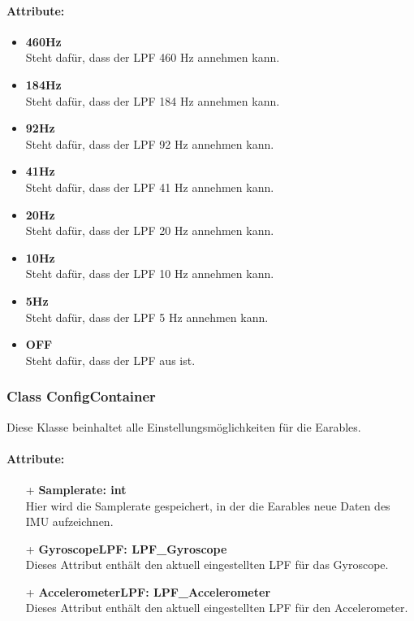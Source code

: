 \documentclass[a4paper,12pt]{article}
\begin{document}
\paragraph{Attribute:}
\begin{itemize}
	\item \textbf{460Hz}\\Steht dafür, dass der LPF 460 Hz annehmen kann.
	\item \textbf{184Hz}\\Steht dafür, dass der LPF 184 Hz annehmen kann.
	\item \textbf{92Hz}\\Steht dafür, dass der LPF 92 Hz annehmen kann.
	\item \textbf{41Hz}\\Steht dafür, dass der LPF 41 Hz annehmen kann.
	\item \textbf{20Hz}\\Steht dafür, dass der LPF 20 Hz annehmen kann.
	\item \textbf{10Hz}\\Steht dafür, dass der LPF 10 Hz annehmen kann.
	\item \textbf{5Hz}\\Steht dafür, dass der LPF 5 Hz annehmen kann.
	\item \textbf{OFF}\\Steht dafür, dass der LPF aus ist.
\end{itemize}


\subsubsection{Class ConfigContainer}
Diese Klasse beinhaltet alle Einstellungsmöglichkeiten für die Earables.

\paragraph{Attribute:}
\begin{itemize}
	\item[+] \textbf{Samplerate: int}\\Hier wird die Samplerate gespeichert, in der die Earables neue Daten des IMU aufzeichnen.
	\item[+] \textbf{GyroscopeLPF: LPF\_Gyroscope}\\Dieses Attribut enthält den aktuell eingestellten LPF für das Gyroscope.
	\item[+] \textbf{AccelerometerLPF: LPF\_Accelerometer}\\Dieses Attribut enthält den aktuell eingestellten LPF für den Accelerometer.
\end{itemize}
\end{document}
